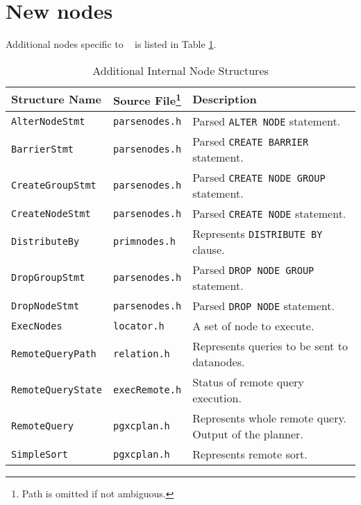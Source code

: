 %
%



\section{\label{sec:newnodes}New nodes}

  Additional nodes specific to \XC~ is listed in Table \ref{tab:newnodes}.
  
  \begin{table}[htp]
  \begin{center}
  \caption{\label{tab:newnodes}Additional Internal Node Structures}\vspace{5pt}
  \begin{tabular}{llp{0.5\hsize}} \hline
  	Structure Name & Source File\footnote{Path is omitted if not ambiguous.} & Description\\ \hline
  	{\tt AlterNodeStmt} & {\tt parsenodes.h} & Parsed {\tt ALTER NODE} statement.\\
  	{\tt BarrierStmt} & {\tt parsenodes.h} & Parsed {\tt CREATE BARRIER} statement.\\
  	{\tt CreateGroupStmt} & {\tt parsenodes.h} & Parsed {\tt CREATE NODE GROUP} statement.\\
  	{\tt CreateNodeStmt} & {\tt parsenodes.h} & Parsed {\tt CREATE NODE} statement.\\
  	{\tt DistributeBy} & {\tt primnodes.h} & Represents {\tt DISTRIBUTE BY} clause.\\
  	{\tt DropGroupStmt} & {\tt parsenodes.h} & Parsed {\tt DROP NODE GROUP} statement.\\
  	{\tt DropNodeStmt} & {\tt parsenodes.h} & Parsed {\tt DROP NODE} statement.\\
  	{\tt ExecNodes} & {\tt locator.h} & A set of node to execute.\\
  	{\tt RemoteQueryPath} & {\tt relation.h} & Represents queries to be sent to datanodes.\\
  	{\tt RemoteQueryState} & {\tt execRemote.h} & Status of remote query execution.\\
  	{\tt RemoteQuery} & {\tt pgxcplan.h} & Represents whole remote query.
										   Output of the planner.\\
  	{\tt SimpleSort} & {\tt pgxcplan.h} & Represents remote sort.\\
  	\hline
  \end{tabular}
  \end{center}
  \end{table}
  
